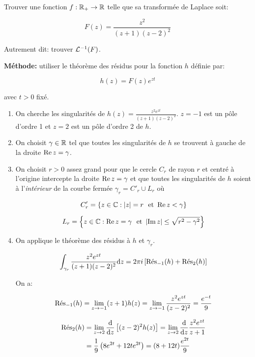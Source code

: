 \begin{example}[3]
    Trouver une fonction $f: \R_+ \rightarrow \R$ telle que sa transformée de Laplace soit:
    
    \[ F(z) = \frac{z^2}{(z+1)(z-2)^2} \]
    
    Autrement dit: trouver $\TLi(F)$.
    
    \textbf{Méthode:} utiliser le théorème des résidus pour la fonction $h$ définie par:
    
    \[ h(z) = F(z) e^{zt} \]
    
    avec $t > 0$ fixé.
    
    \begin{enumerate}
        \item 
        On cherche les singularités de $h(z) = \frac{z^2 e^{zt}}{(z+1)(z-2)^2}$.
        $z = -1$ est un pôle d'ordre 1 et $z = 2$ est un pôle d'ordre 2 de $h$.
        
        \item 
        On choisit $\gamma \in \R$ tel que toutes les singularités de $h$ se trouvent à gauche de la droite $\Rep z = \gamma$.
        
        \item 
        On choisit $r > 0$ assez grand pour que le cercle $C_r$ de rayon $r$ et centré à l'origine intercepte la droite $\Rep z = \gamma$ et que toutes les singularités de $h$ soient à l'\textit{intérieur} de la courbe fermée $\gamma_r = C'_r \cup L_r$ où
        
        \[ C'_r = \left\{ z \in \Cx : |z| = r \ \textrm{ et } \Rep z < \gamma \right\} \]
        
        \[ L_r = \left\{ z \in \Cx : \Rep z = \gamma \ \textrm{ et } \module{\Imp z} \leq \sqrt{r^2 - \gamma^2} \right\} \]
        
        \item 
        On applique le théorème des résidus à $h$ et $\gamma_r$.
        
        \[ \int_{\gamma_r} \frac{z^2 e^{zt}}{(z+1)(z-2)^2} \dz = 2 \pi i \left[ \Res_{-1}(h) + \Res_2(h) \right] \]
        
        On a:
        
        \[
            \Res_{-1}(h)
            = \lim_{z \rightarrow -1} (z + 1) h(z)
            = \lim_{z \rightarrow -1} \frac{z^2 e^{zt}}{(z-2)^2}
            = \frac{e^{-t}}{9}
        \]
        
        \begin{align*}
            \Res_2(h)
            &= \lim_{z \rightarrow 2} \frac{\dd}{\dz} \left[ (z - 2)^2 h(z) \right]
            = \lim_{z \rightarrow 2} \frac{\dd}{\dz} \frac{z^2 e^{zt}}{z+1}
            \\&= \frac{1}{9} \left( 8 e^{2t} + 12t e^{2t} \right)
            = (8 + 12t) \frac{e^{2t}}{9}
        \end{align*}
        

\end{enumerate}
\end{example}
